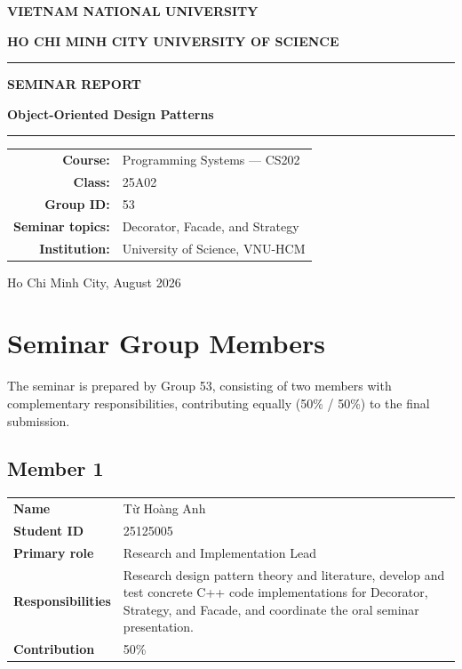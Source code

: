 \documentclass[11pt,a4paper]{report}
\begin{document}
\hypersetup{pageanchor=false}

\begin{titlepage}
  \centering
  {\Large\bfseries VIETNAM NATIONAL UNIVERSITY\par}
  \vspace{0.35cm}
  {\Large\bfseries HO CHI MINH CITY UNIVERSITY OF SCIENCE\par}
  \vspace{2.2cm}
  {\color{usblue}\rule{\textwidth}{1.2pt}\par}
  \vspace{0.65cm}
  {\Huge\bfseries SEMINAR REPORT\par}
  \vspace{0.4cm}
  {\LARGE\bfseries Object-Oriented Design Patterns\par}
  \vspace{0.65cm}
  {\color{usblue}\rule{\textwidth}{1.2pt}\par}

  \vfill
  \begin{tabular}{rl}
    \textbf{Course:} & Programming Systems --- CS202 \\
    \textbf{Class:} & 25A02 \\
    \textbf{Group ID:} & 53 \\
    \textbf{Seminar topics:} & Decorator, Facade, and Strategy \\
    \textbf{Institution:} & University of Science, VNU-HCM \\
  \end{tabular}

  \vfill
  {\large Ho Chi Minh City, August 2026\par}
\end{titlepage}

\hypersetup{pageanchor=true}
\chapter*{Seminar Group Members}

The seminar is prepared by Group 53, consisting of two members with
complementary responsibilities, contributing equally (50\% / 50\%) to the final submission.

\section*{Member 1}
\begin{tabularx}{\textwidth}{@{}lY@{}}
\toprule
\textbf{Name} & \foreignlanguage{vietnamese}{Từ Hoàng Anh} \\
\textbf{Student ID} & 25125005 \\
\textbf{Primary role} & Research and Implementation Lead \\
\textbf{Responsibilities} & Research design pattern theory and literature, develop and test concrete C++ code implementations for Decorator, Strategy, and Facade, and coordinate the oral seminar presentation. \\
\textbf{Contribution} & 50\% \\
\bottomrule
\end{tabularx}
\end{document}
